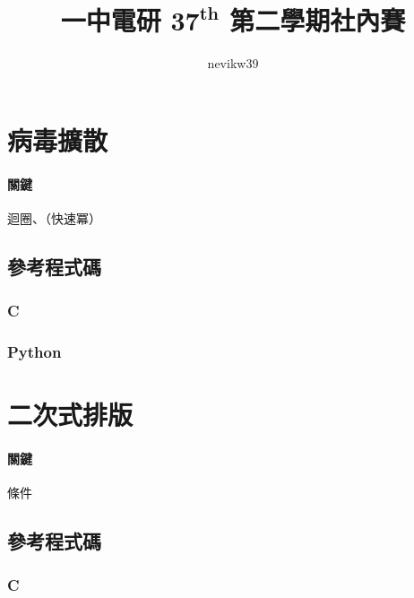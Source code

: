 \documentclass[a4paper,10pt]{article}
\title{\fontseries{b}一中電研 $\mathbf{37^{th}}$ 第二學期社內賽 \enspace {\huge\fontseries{eb}\selectfont 題目解析}}
\author{\fontshape{it}nevikw39}
\begin{document}
\maketitle

\begin{abstract}


\end{abstract}

\section{病毒擴散}

\paragraph{關鍵} 迴圈、（快速冪）

\subsection{參考程式碼}

\subsubsection{C}



\subsubsection{Python}



\section{二次式排版}

\paragraph{關鍵} 條件

\subsection{參考程式碼}

\subsubsection{C}
\end{document}
